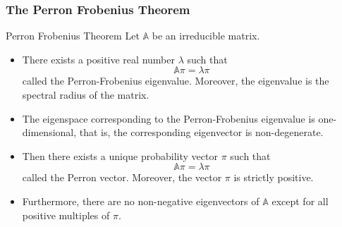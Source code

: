 \documentclass[9pt]{beamer}
\newcommand{\A}{\mathbb{A}}
\begin{document}
\begin{frame}
  \frametitle{The Perron Frobenius Theorem}
  \begin{block}{Perron Frobenius Theorem}
    Let $\A$ be an irreducible matrix.
    \begin{itemize}
    \item There exists a positive real number $\lambda$ such that
      $$\A \pi = \lambda \pi$$ called the Perron-Frobenius eigenvalue. Moreover, the eigenvalue is the
      spectral radius of the matrix.
    \item The eigenspace corresponding to the Perron-Frobenius eigenvalue is one-dimensional, that is, the corresponding eigenvector is non-degenerate.
    \item  Then there exists a unique probability vector $\pi$ such that
    $$ \A \pi =  \lambda \pi$$ called the Perron vector. 
    Moreover, the vector $\pi$ is strictly positive.
      \item Furthermore, there are no non-negative eigenvectors of $\A$ except for all positive multiples
            of $\pi$.
    \end{itemize}
  \end{block}
\end{frame}
\end{document}
